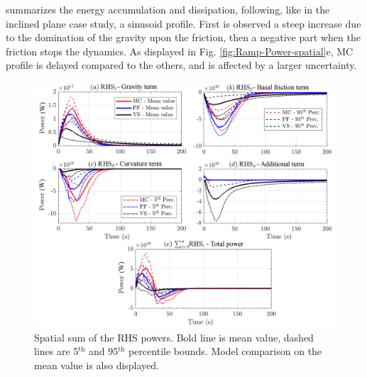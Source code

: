 \documentclass{article}
\begin{document}
summarizes the energy accumulation and dissipation, following, like in the inclined plane case study, a sinusoid profile. First is observed a steep increase due to the domination of the gravity upon the friction, then a negative part when the friction stops the dynamics. As displayed in Fig. \ref{fig:Ramp-Power-spatial}e, MC profile is delayed compared to the others, and is affected by a larger uncertainty.
\begin{figure}[H]
        \centering
        \includegraphics[width=1\textwidth]{BAF_VolcanDeColima/AveragedMeasurments/PowersColima.png}
        \caption{Spatial sum of the RHS powers. Bold line is mean value, dashed lines are 5$^{\mathrm{th}}$ and 95$^{\mathrm{th}}$ percentile bounds. Model comparison on the mean value is also displayed.}
        \label{fig:Colima-Power-spatial}
\end{figure}
\end{document}
